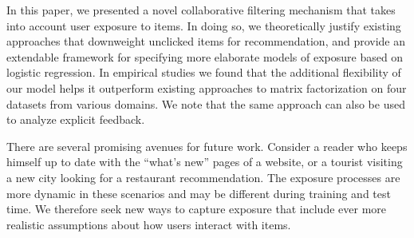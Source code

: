 \documentclass{sig-alternate-arxiv}
\begin{document}
In this paper, we presented a novel collaborative filtering mechanism
that takes into account user exposure to items. 
In doing so, we theoretically justify existing approaches that 
downweight unclicked items for recommendation, 
and provide an extendable framework 
for specifying more elaborate models of exposure based on logistic regression. 
In empirical studies we found 
that the additional flexibility of our model 
helps it outperform existing approaches to 
matrix factorization on four datasets from various domains. 
We note that the same approach can also be used 
to analyze explicit feedback. 

There are several promising avenues for future work. 
Consider a reader who keeps himself up to date with the ``what's new'' pages 
of a website, or 
a tourist visiting a new city looking for a restaurant recommendation. 
The exposure processes are more dynamic in these scenarios 
and may be different during training and test time. 
We therefore seek new ways to capture exposure that include 
ever more realistic assumptions about how users interact with items. 

 

{

  }
\end{document}
